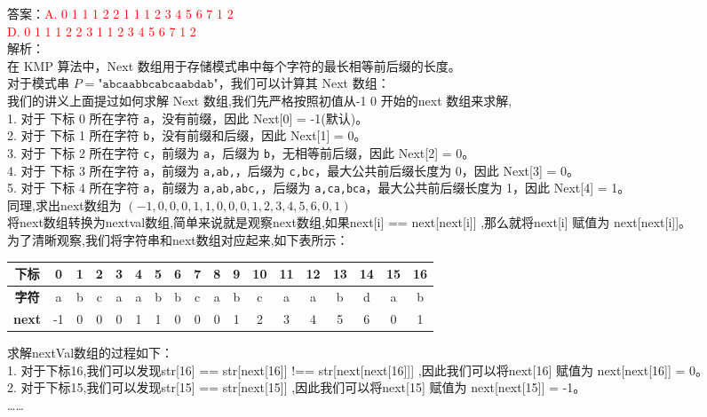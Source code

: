 \documentclass[lang=cn,newtx,10pt,scheme=chinese]{../../../elegantbook}
\begin{document}
\begin{enumerate}
    答案：\textcolor{red}{A. 0 1 1 1 2 2 1 1 1 2 3 4 5 6 7 1 2}\\ 
    \textcolor{red}{D. 0 1 1 1 2 2 3 1 1 2 3 4 5 6 7 1 2}\\
    解析：\\
    在 KMP 算法中，Next 数组用于存储模式串中每个字符的最长相等前后缀的长度。\\
    对于模式串 $P = \texttt{"abcaabbcabcaabdab"}$，我们可以计算其 Next 数组：\\
    我们的讲义上面提过如何求解 Next 数组,我们先严格按照初值从-1 0 开始的next 数组来求解,\\
    1. 对于 下标 0 所在字符 \texttt{a}，没有前缀，因此 Next[0] = -1(默认)。\\
    2. 对于 下标 1 所在字符 \texttt{b}，没有前缀和后缀，因此 Next[1] = 0。\\
    3. 对于 下标 2 所在字符 \texttt{c}，前缀为 \texttt{a}，后缀为 \texttt{b}，无相等前后缀，因此 Next[2] = 0。\\
    4. 对于 下标 3 所在字符 \texttt{a}，前缀为 \texttt{a,ab,}，后缀为 \texttt{c,bc}，最大公共前后缀长度为 0，因此 Next[3] = 0。\\
    5. 对于 下标 4 所在字符 \texttt{a}，前缀为 \texttt{a,ab,abc,}，后缀为 \texttt{a,ca,bca}，最大公共前后缀长度为 1，因此 Next[4] = 1。\\

    同理,求出next数组为 $(-1,0,0,0,1,1,0,0,0,1,2,3,4,5,6,0,1)$\\
    
    将next数组转换为nextval数组,简单来说就是观察next数组,如果next[i] == next[next[i]] ,那么就将next[i] 赋值为 next[next[i]]。\\
    为了清晰观察,我们将字符串和next数组对应起来,如下表所示：\\
    \begin{center}
    \begin{tabular}{|c|c|c|c|c|c|c|c|c|c|c|c|c|c|c|c|c|c|}
    \hline
    \textbf{下标} & 0 & 1 & 2 & 3 & 4 & 5 & 6 & 7 & 8 & 9 & 10 & 11 & 12 & 13 & 14 & 15 & 16 \\
    \hline
    \textbf{字符} & a & b & c & a & a & b & b & c & a & b & c & a & a & b & d & a & b \\
    \hline
    \textbf{next} & -1 & 0 & 0 & 0 & 1 & 1 & 0 & 0 & 0 & 1 & 2 & 3 & 4 & 5 & 6 & 0 & 1 \\
    \hline
    \end{tabular}
    \end{center}

    求解nextVal数组的过程如下：\\
    1. 对于下标16,我们可以发现str[16] == str[next[16]] !== str[next[next[16]]] ,因此我们可以将next[16] 赋值为 next[next[16]] = 0。\\
    2. 对于下标15,我们可以发现str[15] == str[next[15]] ,因此我们可以将next[15] 赋值为 next[next[15]] = -1。\\
    \dots\dots\\


\end{enumerate}
\end{document}
